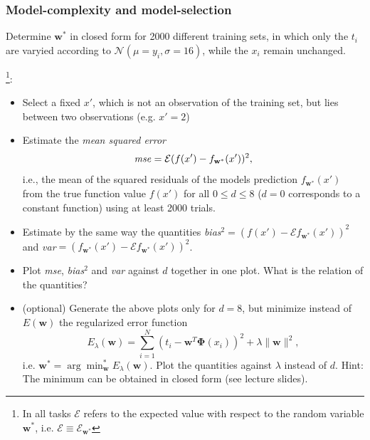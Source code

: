 \documentclass[a4]{article}
\begin{document}
\subsubsection{Model-complexity and model-selection}
Determine ${\mathbf w}^*$ in closed form for 2000 different training sets, in which only the $t_i$ are varyied according to $\mathcal{N}(\mu = y_i,\sigma = 16)$, while the $x_i$ remain unchanged. 

\vspace{2mm}
\footnote{In all tasks $\mathcal{E}$ refers to the expected value with respect to the random variable ${\mathbf w^*}$, i.e. $\mathcal{E} \equiv \mathcal{E}_{\mathbf w^*}$}:
\begin{itemize}
\item Select a fixed $x'$, which is not an observation of the training set, but lies between two observations (e.g. $x' = 2$)
\item Estimate the \emph{mean squared error} 
\begin{equation} \nonumber
\mbox{\emph{mse}} = \mathcal{E} (f(x')-f_{\mathbf w^*}(x'))^2,
\end{equation}i.e., the mean of the squared residuals of the models prediction $f_{\mathbf w^*}(x')$ from the true function value $f(x')$ for all $0 \leq d \leq 8$ ($d = 0$ corresponds to a constant function) using at least 2000 trials.  
\item Estimate by the same way the quantities \emph{bias}$^2 = (f(x')-\mathcal{E} f_{\mathbf w^*}(x'))^2$ and \emph{var}$ = (f_{\mathbf w^*}(x') - \mathcal{E} f_{\mathbf w^*}(x'))^2$.
\item Plot \emph{mse}, \emph{bias}$^2$ and \emph{var} against $d$ together in one plot. What is the relation of the quantities?
\item (optional) Generate the above plots only for $d=8$, but minimize instead of $E({\mathbf w})$ the regularized error function 
\begin{equation}
E_{\lambda}({\mathbf w}) = \sum_{i = 1}^N(t_i - {\mathbf w}^T{\mathbf \Phi}(x_i))^2 + \lambda \|{\mathbf w}\|^2,
\end{equation} 
i.e. ${\mathbf w}^* = \arg\min_{\mathbf w}^* E_{\lambda}({\mathbf w})$. Plot the quantities against $\lambda$ instead of $d$. Hint: The minimum can be obtained in closed form (see lecture slides). 
\end{itemize}
\end{document}

